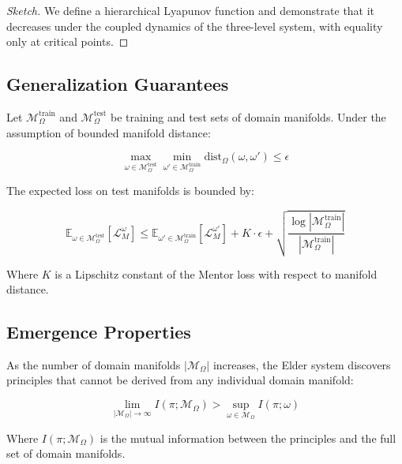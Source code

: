 \begin{proof}[Sketch]
We define a hierarchical Lyapunov function and demonstrate that it decreases under the coupled dynamics of the three-level system, with equality only at critical points.
\end{proof}

\subsection{Generalization Guarantees}

\begin{theorem}
Let $\mathcal{M}_{\Omega}^{\text{train}}$ and $\mathcal{M}_{\Omega}^{\text{test}}$ be training and test sets of domain manifolds. Under the assumption of bounded manifold distance:

\begin{equation}
\max_{\omega \in \mathcal{M}_{\Omega}^{\text{test}}} \min_{\omega' \in \mathcal{M}_{\Omega}^{\text{train}}} \text{dist}_{\Omega}(\omega, \omega') \leq \epsilon
\end{equation}

The expected loss on test manifolds is bounded by:

\begin{equation}
\mathbb{E}_{\omega \in \mathcal{M}_{\Omega}^{\text{test}}} [\mathcal{L}_M^{\omega}] \leq \mathbb{E}_{\omega' \in \mathcal{M}_{\Omega}^{\text{train}}} [\mathcal{L}_M^{\omega'}] + K \cdot \epsilon + \sqrt{\frac{\log|\mathcal{M}_{\Omega}^{\text{train}}|}{|\mathcal{M}_{\Omega}^{\text{train}}|}}
\end{equation}

Where $K$ is a Lipschitz constant of the Mentor loss with respect to manifold distance.
\end{theorem}

\subsection{Emergence Properties}

\begin{theorem}
As the number of domain manifolds $|\mathcal{M}_{\Omega}|$ increases, the Elder system discovers principles that cannot be derived from any individual domain manifold:

\begin{equation}
\lim_{|\mathcal{M}_{\Omega}| \to \infty} I(\pi; \mathcal{M}_{\Omega}) > \sup_{\omega \in \mathcal{M}_{\Omega}} I(\pi; \omega)
\end{equation}

Where $I(\pi; \mathcal{M}_{\Omega})$ is the mutual information between the principles and the full set of domain manifolds.
\end{theorem}

